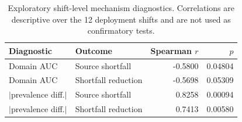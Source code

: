 \begin{table}[!tbp]
\centering
\caption{Exploratory shift-level mechanism diagnostics. Correlations are descriptive over the 12 deployment shifts and are not used as confirmatory tests.}
\label{primary-tab:mechanism_correlation}
\footnotesize
\begin{tabular}{llrr}
\toprule
Diagnostic & Outcome & Spearman $r$ & $p$ \\
\midrule
Domain AUC & Source shortfall & -0.5800 & 0.04804 \\
Domain AUC & Shortfall reduction & -0.5698 & 0.05309 \\
$|$prevalence diff.$|$ & Source shortfall & 0.8258 & 0.00094 \\
$|$prevalence diff.$|$ & Shortfall reduction & 0.7413 & 0.00580 \\
\bottomrule
\end{tabular}
\end{table}
